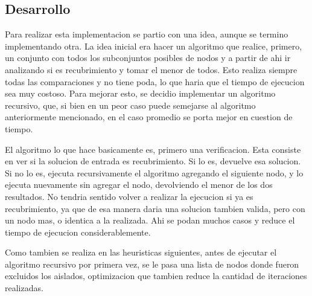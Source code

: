 \subsection{Desarrollo}
Para realizar esta implementacion se partio con una idea, aunque se termino implementando otra. La idea inicial era hacer un algoritmo que realice, primero, un conjunto con todos los subconjuntos posibles de nodos y a partir de ahi ir analizando si es recubrimiento y tomar el menor de todos. Esto realiza siempre todas las comparaciones y no tiene poda, lo que haria que el tiempo de ejecucion sea muy costoso.
Para mejorar esto, se decidio implementar un algoritmo recursivo, que, si bien en un peor caso puede semejarse al algoritmo anteriormente mencionado, en el caso promedio se porta mejor en cuestion de tiempo.

El algoritmo lo que hace basicamente es, primero una verificacion. Esta consiste en ver si la solucion de entrada es recubrimiento. Si lo es, devuelve esa solucion. Si no lo es, ejecuta recursivamente el algoritmo agregando el siguiente nodo, y lo ejecuta nuevamente sin agregar el nodo, devolviendo el menor de los dos resultados.
No tendria sentido volver a realizar la ejecucion si ya es recubrimiento, ya que de esa manera daria una solucion tambien valida, pero con un nodo mas, o identica a la realizada. Ahi se podan muchos casos y reduce el tiempo de ejecucion considerablemente. 

Como tambien se realiza en las heuristicas siguientes, antes de ejecutar el algoritmo recursivo por primera vez, se le pasa una lista de nodos donde fueron excluidos los aislados, optimizacion que tambien reduce la cantidad de iteraciones realizadas.
